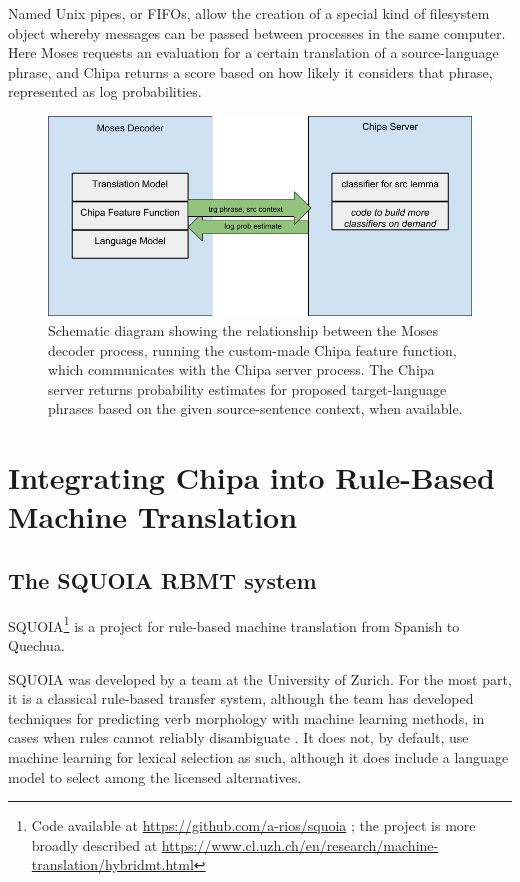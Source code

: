 Named Unix pipes, or FIFOs, allow the creation of a special kind of filesystem
object whereby messages can be passed between processes in the same computer.
Here Moses requests an evaluation for a certain translation of a
source-language phrase, and Chipa returns a score based on how likely it
considers that phrase, represented as log probabilities. 

\begin{figure}
  \begin{centering}
  \includegraphics[width=15cm]{moses-chipa-diagram.png}
  \end{centering}
  \caption{Schematic diagram showing the relationship between the Moses decoder
  process, running the custom-made Chipa feature function, which communicates
  with the Chipa server process. The Chipa server returns probability
  estimates for proposed target-language phrases based on the given
  source-sentence context, when available.}
  \label{fig:moses-chipa-diagram}
\end{figure}

\section{Integrating Chipa into Rule-Based Machine Translation}


\subsection{The SQUOIA RBMT system}
SQUOIA\footnote{Code available at \url{https://github.com/a-rios/squoia} ;
the project is more broadly described at
\url{https://www.cl.uzh.ch/en/research/machine-translation/hybridmt.html}}
is a project for rule-based machine translation from Spanish to Quechua.

SQUOIA was developed by a team at the University of Zurich. For the most
part, it is a classical rule-based transfer system, although the team has
developed techniques for predicting verb morphology with machine
learning methods, in cases when rules cannot reliably disambiguate
\cite{riosgonzales-gohring:2013:HyTra}. It does not, by default, use machine
learning for lexical selection as such, although it does include a language
model to select among the licensed alternatives.

